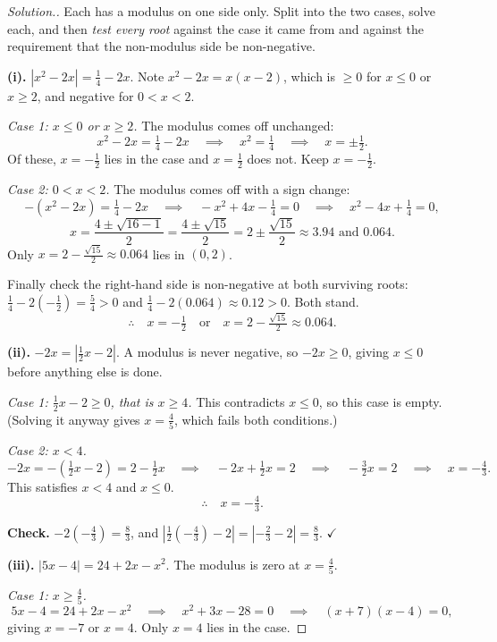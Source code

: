 \documentclass[11pt,a4paper]{article}
\theoremstyle{definition}
\newenvironment{solution}
  {\renewcommand{\qedsymbol}{}\begin{proof}[\textit{Solution}.]}
  {\end{proof}}
\let\amscheckmark\checkmark
\renewcommand{\checkmark}{\ensuremath{\amscheckmark}}
\begin{document}
\begin{solution}
Each has a modulus on one side only. Split into the two cases, solve each, and then
\emph{test every root} against the case it came from and against the requirement that
the non-modulus side be non-negative.

\textbf{(i).} $\left|x^2-2x\right|=\frac{1}{4}-2x$. Note $x^2-2x=x(x-2)$, which is
$\geq 0$ for $x\leq 0$ or $x\geq 2$, and negative for $0<x<2$.

\emph{Case 1: $x\leq 0$ or $x\geq 2$.} The modulus comes off unchanged:
$$x^2-2x=\tfrac{1}{4}-2x\quad\implies\quad x^2=\tfrac{1}{4}\quad\implies\quad
x=\pm\tfrac{1}{2}.$$
Of these, $x=-\frac{1}{2}$ lies in the case and $x=\frac{1}{2}$ does not. Keep
$x=-\frac{1}{2}$.

\emph{Case 2: $0<x<2$.} The modulus comes off with a sign change:
$$-\left(x^2-2x\right)=\tfrac{1}{4}-2x\quad\implies\quad -x^2+4x-\tfrac{1}{4}=0
\quad\implies\quad x^2-4x+\tfrac{1}{4}=0,$$
$$x=\frac{4\pm\sqrt{16-1}}{2}=\frac{4\pm\sqrt{15}}{2}=2\pm\frac{\sqrt{15}}{2}
\approx 3.94 \text{ and } 0.064.$$
Only $x=2-\frac{\sqrt{15}}{2}\approx 0.064$ lies in $(0,2)$.

Finally check the right-hand side is non-negative at both surviving roots:
$\frac{1}{4}-2\left(-\frac{1}{2}\right)=\frac{5}{4}>0$ and
$\frac{1}{4}-2(0.064)\approx 0.12>0$. Both stand.
$$\therefore\quad x=-\tfrac{1}{2}\quad\text{or}\quad x=2-\tfrac{\sqrt{15}}{2}
\approx 0.064.$$

\textbf{(ii).} $-2x=\left|\frac{1}{2}x-2\right|$. A modulus is never negative, so
$-2x\geq 0$, giving $x\leq 0$ before anything else is done.

\emph{Case 1: $\frac{1}{2}x-2\geq 0$, that is $x\geq 4$.} This contradicts $x\leq 0$, so
this case is empty. (Solving it anyway gives $x=\frac{4}{5}$, which fails both
conditions.)

\emph{Case 2: $x<4$.}
$$-2x=-\left(\tfrac{1}{2}x-2\right)=2-\tfrac{1}{2}x\quad\implies\quad
-2x+\tfrac{1}{2}x=2\quad\implies\quad -\tfrac{3}{2}x=2\quad\implies\quad
x=-\tfrac{4}{3}.$$
This satisfies $x<4$ and $x\leq 0$.
$$\therefore\quad x=-\tfrac{4}{3}.$$

\textbf{Check.} $-2\left(-\frac{4}{3}\right)=\frac{8}{3}$, and
$\left|\frac{1}{2}\left(-\frac{4}{3}\right)-2\right|=\left|-\frac{2}{3}-2\right|
=\frac{8}{3}$. $\checkmark$

\textbf{(iii).} $|5x-4|=24+2x-x^2$. The modulus is zero at $x=\frac{4}{5}$.

\emph{Case 1: $x\geq\frac{4}{5}$.}
$$5x-4=24+2x-x^2\quad\implies\quad x^2+3x-28=0\quad\implies\quad (x+7)(x-4)=0,$$
giving $x=-7$ or $x=4$. Only $x=4$ lies in the case.


\end{solution}
\end{document}
